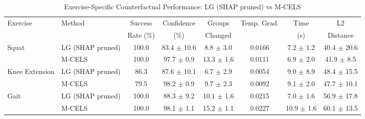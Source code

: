 \begin{table}[t]
\centering
\caption{Exercise-Specific Counterfactual Performance: LG (SHAP pruned) vs M-CELS}
\label{tab:exercise_specific}
\begin{tabular}{llcccccc}
\toprule
Exercise & Method & Success & Confidence & Groups & Temp. Grad. & Time & L2 \\
         &        & Rate (\%) & (\%) & Changed & & (s) & Distance \\
\midrule
Squat & LG (SHAP pruned) & 100.0 & 83.4 $\pm$ 10.6 & 8.8 $\pm$ 3.0 & 0.0166 & 7.2 $\pm$ 1.2 & 40.4 $\pm$ 20.6 \\
 & M-CELS & 100.0 & 97.7 $\pm$ 0.9 & 13.3 $\pm$ 1.6 & 0.0111 & 6.9 $\pm$ 2.0 & 41.9 $\pm$ 8.5 \\
\midrule
Knee Extension & LG (SHAP pruned) & 86.3 & 87.6 $\pm$ 10.1 & 6.7 $\pm$ 2.9 & 0.0054 & 9.0 $\pm$ 8.9 & 48.4 $\pm$ 15.5 \\
 & M-CELS & 79.5 & 98.2 $\pm$ 0.9 & 9.7 $\pm$ 2.3 & 0.0092 & 9.1 $\pm$ 2.0 & 47.7 $\pm$ 10.1 \\
\midrule
Gait & LG (SHAP pruned) & 100.0 & 88.3 $\pm$ 9.2 & 10.1 $\pm$ 1.6 & 0.0215 & 7.0 $\pm$ 1.6 & 56.9 $\pm$ 17.8 \\
 & M-CELS & 100.0 & 98.1 $\pm$ 1.1 & 15.2 $\pm$ 1.1 & 0.0227 & 10.9 $\pm$ 1.6 & 60.1 $\pm$ 13.5 \\
\bottomrule
\end{tabular}
\end{table}